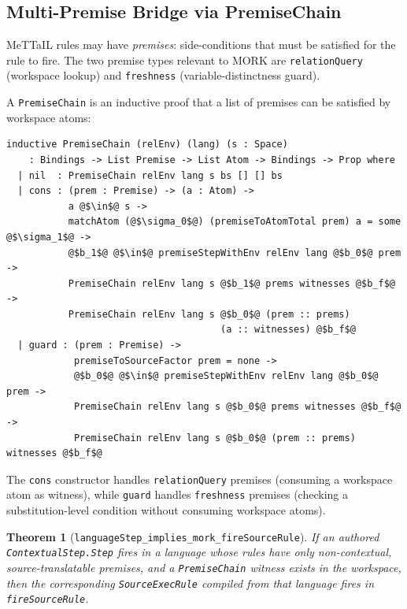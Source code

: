 \documentclass[11pt]{article}
\newtheorem{theorem}{Theorem}[section]
\theoremstyle{definition}
\theoremstyle{remark}
\newcommand{\MORK}{\textup{MORK}}
\newcommand{\MeTTaIL}{\textup{MeTTaIL}}
\begin{document}
\subsection{Multi-Premise Bridge via PremiseChain}

\MeTTaIL{} rules may have \emph{premises}: side-conditions that must be
satisfied for the rule to fire.  The two premise types relevant to \MORK{}
are \texttt{relationQuery} (workspace lookup) and \texttt{freshness}
(variable-distinctness guard).

A \texttt{PremiseChain} is an inductive proof that a list of premises
can be satisfied by workspace atoms:

\begin{lstlisting}[caption={PremiseChain inductive type.}]
inductive PremiseChain (relEnv) (lang) (s : Space)
    : Bindings -> List Premise -> List Atom -> Bindings -> Prop where
  | nil  : PremiseChain relEnv lang s bs [] [] bs
  | cons : (prem : Premise) -> (a : Atom) ->
           a @$\in$@ s ->
           matchAtom (@$\sigma_0$@) (premiseToAtomTotal prem) a = some @$\sigma_1$@ ->
           @$b_1$@ @$\in$@ premiseStepWithEnv relEnv lang @$b_0$@ prem ->
           PremiseChain relEnv lang s @$b_1$@ prems witnesses @$b_f$@ ->
           PremiseChain relEnv lang s @$b_0$@ (prem :: prems)
                                      (a :: witnesses) @$b_f$@
  | guard : (prem : Premise) ->
            premiseToSourceFactor prem = none ->
            @$b_0$@ @$\in$@ premiseStepWithEnv relEnv lang @$b_0$@ prem ->
            PremiseChain relEnv lang s @$b_0$@ prems witnesses @$b_f$@ ->
            PremiseChain relEnv lang s @$b_0$@ (prem :: prems) witnesses @$b_f$@
\end{lstlisting}

\noindent
The \texttt{cons} constructor handles \texttt{relationQuery} premises
(consuming a workspace atom as witness), while \texttt{guard} handles
\texttt{freshness} premises (checking a substitution-level condition without
consuming workspace atoms).

\begin{theorem}[\texttt{languageStep\_implies\_mork\_fireSourceRule}]
\label{thm:multibridge}
If an authored \texttt{ContextualStep.Step} fires in a language whose rules
have only non-contextual, source-translatable premises, and a
\texttt{PremiseChain} witness exists in the workspace, then the corresponding
\texttt{SourceExecRule} compiled from that language fires in
\texttt{fireSourceRule}.
\end{theorem}
\end{document}
